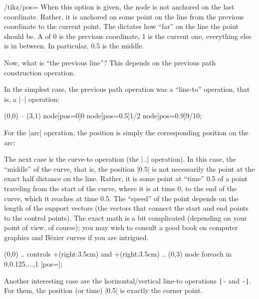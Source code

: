 \label{section-pos-option}

\begin{key}{/tikz/pos=}
  When this option is given, the node is not anchored on the last
  coordinate. Rather, it is anchored on some point on the line from
  the previous coordinate to the current point. The 
  dictates how ``far'' on the line the point should be. A
   of 0 is the previous coordinate, 1 is the current
  one, everything else is in between. In particular, 0.5 is the
  middle.

  Now, what is ``the previous line''? This depends on the previous
  path construction operation.

  In the simplest case, the previous path operation was a ``line-to''
  operation, that is, a  |--| operation:
\begin{codeexample}[]
\tikz \draw (0,0) -- (3,1)
    node[pos=0]{0} node[pos=0.5]{1/2} node[pos=0.9]{9/10};
\end{codeexample}

  For the |arc| operation, the position is simply the corresponding
  position on the arc:
\begin{codeexample}[]
\end{codeexample}

  The next case is the curve-to operation (the |..| operation). In this
  case, the ``middle'' of the curve, that is, the position |0.5| is
  not necessarily the point at the exact half distance on the
  line. Rather, it is some point at ``time'' 0.5 of a point traveling
  from the start of the curve, where it is at time 0, to the end of
  the curve, which it reaches at time 0.5. The ``speed'' of the point
  depends on the length of the support vectors (the vectors that
  connect the start and end points to the control points). The exact
  math is a bit complicated (depending on your point of view, of
  course); you may wish to consult a good book on computer graphics
  and B\'ezier curves if you are intrigued.
\begin{codeexample}[]
\tikz \draw (0,0) .. controls +(right:3.5cm) and +(right:3.5cm) .. (0,3)
  node foreach \p in {0,0.125,...,1} [pos=\p]{\p};
\end{codeexample}

  Another interesting case are the horizontal/vertical line-to operations
  \verb!|-! and \verb!-|!. For them, the position (or time) |0.5| is
  exactly the corner point.


\end{key}
